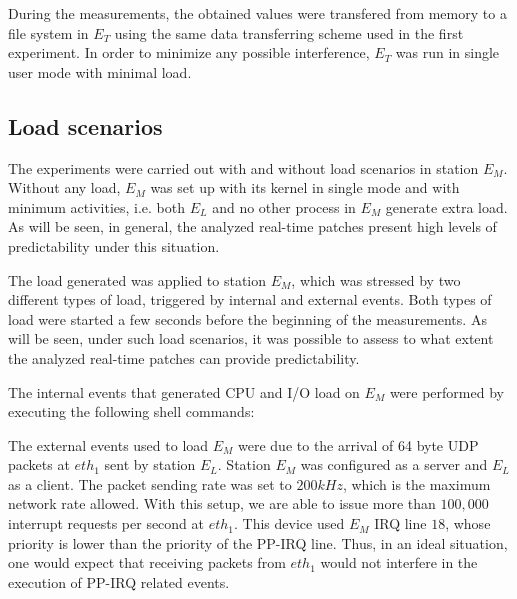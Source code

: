 \documentclass{acm_proc_article-sp}
\begin{document}
During the measurements, the obtained values were transfered from memory to a file
system in $E_T$ using the same data transferring scheme used in the first
experiment. In order to minimize any possible interference, $E_T$ was run in
  single user mode with minimal load.

\subsection{Load scenarios}
\label{sec:carga}

The experiments were carried out with and without load scenarios in station
$E_M$. Without any load, $E_M$ was set up with its kernel in single mode and with
minimum activities, i.e. both $E_L$ and no other process in $E_M$ generate extra
load. As will be seen, in general, the analyzed real-time patches present high
levels of predictability under this situation.

The load generated was applied to station $E_M$, which was stressed by two different
types of load, triggered by internal and external events. Both types of load were
started a few seconds before the beginning of the measurements.  As will be
seen, under such load scenarios, it was possible to assess to what extent the
analyzed real-time patches can provide predictability.

The internal events that generated CPU and I/O load on $E_M$ were performed by
executing the following shell commands:


The external events used to load $E_M$ were due to the arrival of 64 byte UDP
packets at $eth_1$ sent by station $E_L$. Station $E_M$ was configured as a server
and $E_L$ as a client. The packet sending rate was set to $200 kHz$, which is the
maximum network rate allowed. With this setup, we are able to issue more than $100,000$
interrupt requests per second at $eth_1$. This device used $E_M$
IRQ line $18$, whose priority is lower than the priority of the PP-IRQ line. Thus,
in an ideal situation, one would expect that receiving packets from $eth_1$ would
not interfere in the execution of PP-IRQ related events.
\end{document}
